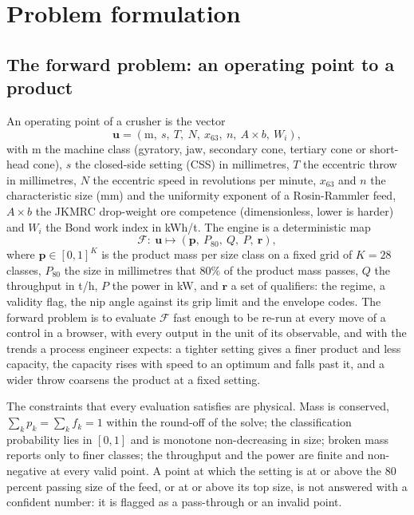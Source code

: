 \section{Problem formulation}\label{sec:problem}

\subsection{The forward problem: an operating point to a product}\label{sec:problem-forward}

An operating point of a crusher is the vector
\begin{equation}
\mathbf u = \left(\mathrm{m},\ s,\ T,\ N,\ x_{63},\ n,\ A\!\times\!b,\ W_i\right),
\label{eq:operating}
\end{equation}
with $\mathrm{m}$ the machine class (gyratory, jaw, secondary cone, tertiary cone or short-head cone), $s$ the
closed-side setting (CSS) in millimetres, $T$ the eccentric throw in millimetres, $N$ the eccentric speed in revolutions
per minute, $x_{63}$ and $n$ the characteristic size (mm) and the uniformity exponent of a Rosin-Rammler feed, $A\times b$
the JKMRC drop-weight ore competence (dimensionless, lower is harder) and $W_i$ the Bond work index in kWh/t. The engine
is a deterministic map
\begin{equation}
\mathcal F:\ \mathbf u \mapsto \left(\mathbf p,\ P_{80},\ Q,\ P,\ \mathbf r\right),
\label{eq:forward}
\end{equation}
where $\mathbf p\in[0,1]^K$ is the product mass per size class on a fixed grid of $K=28$ classes, $P_{80}$ the size in
millimetres that $80\%$ of the product mass passes, $Q$ the throughput in t/h, $P$ the power in kW, and $\mathbf r$ a set
of qualifiers: the regime, a validity flag, the nip angle against its grip limit and the envelope codes. The forward problem
is to evaluate $\mathcal F$ fast enough to be re-run at every move of a control in a browser, with every output in the
unit of its observable, and with the trends a process engineer expects: a tighter setting gives a finer product and less
capacity, the capacity rises with speed to an optimum and falls past it, and a wider throw coarsens the product at a fixed
setting.

The constraints that every evaluation satisfies are physical. Mass is conserved, $\sum_k p_k = \sum_k f_k = 1$ within the
round-off of the solve; the classification probability lies in $[0,1]$ and is monotone non-decreasing in size; broken
mass reports only to finer classes; the throughput and the power are finite and non-negative at every valid point. A point
at which the setting is at or above the 80 percent passing size of the feed, or at or above its top size, is not answered
with a confident number: it is flagged as a pass-through or an invalid point.

